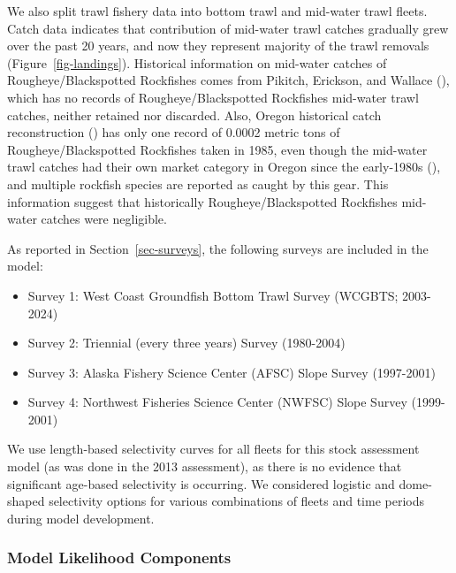 \documentclass[
]{scrartcl}
\providecommand{\tightlist}{%
  \setlength{\itemsep}{0pt}\setlength{\parskip}{0pt}}\usepackage{longtable,booktabs,array}
\begin{document}
We also split trawl fishery data into bottom trawl and mid-water trawl
fleets. Catch data indicates that contribution of mid-water trawl
catches gradually grew over the past 20 years, and now they represent
majority of the trawl removals (Figure~\ref{fig-landings}). Historical
information on mid-water catches of Rougheye/Blackspotted Rockfishes
comes from Pikitch, Erickson, and Wallace
(), which has no records of
Rougheye/Blackspotted Rockfishes mid-water trawl catches, neither
retained nor discarded. Also, Oregon historical catch reconstruction
() has only one record of 0.0002 metric tons of
Rougheye/Blackspotted Rockfishes taken in 1985, even though the
mid-water trawl catches had their own market category in Oregon since
the early-1980s (), and multiple rockfish species are
reported as caught by this gear. This information suggest that
historically Rougheye/Blackspotted Rockfishes mid-water catches were
negligible.

As reported in Section~\ref{sec-surveys}, the following surveys are
included in the model:

\begin{itemize}
\tightlist
\item
  Survey 1: West Coast Groundfish Bottom Trawl Survey (WCGBTS;
  2003-2024)
\item
  Survey 2: Triennial (every three years) Survey (1980-2004)\\
\item
  Survey 3: Alaska Fishery Science Center (AFSC) Slope Survey
  (1997-2001)
\item
  Survey 4: Northwest Fisheries Science Center (NWFSC) Slope Survey
  (1999-2001)
\end{itemize}

We use length-based selectivity curves for all fleets for this stock
assessment model (as was done in the 2013 assessment), as there is no
evidence that significant age-based selectivity is occurring. We
considered logistic and dome-shaped selectivity options for various
combinations of fleets and time periods during model development.

\subsubsection{Model Likelihood
Components}\label{model-likelihood-components}
\end{document}
